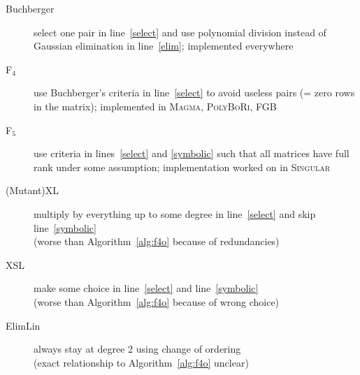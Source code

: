 \documentclass[9pt]{beamer}
\begin{document}
\begin{frame}
\begin{description}
 \item[Buchberger] select one pair in line~\ref{select} and use polynomial division instead of Gaussian elimination in line~\ref{elim}; implemented everywhere
 \item[F$_4$] use Buchberger's criteria in line~\ref{select} to avoid useless pairs (= zero rows in the matrix); implemented in \textsc{Magma}, \textsc{PolyBoRi}, FGB
 \item[F$_5$] use criteria in lines~\ref{select} and \ref{symbolic} such that all matrices have full rank under some assumption; implementation worked on in \textsc{Singular}
 \item[(Mutant)XL] multiply by everything up to some degree in line~\ref{select} and skip line~\ref{symbolic}\\ (worse than Algorithm~\ref{alg:f4o} because of redundancies)
 \item[XSL] make some choice in line~\ref{select} and line~\ref{symbolic} \\(worse than Algorithm~\ref{alg:f4o} because of wrong choice)
 \item[ElimLin] always stay at degree 2 using change of ordering\\(exact relationship to Algorithm~\ref{alg:f4o} unclear)
\end{description}


\end{frame}
\end{document}
